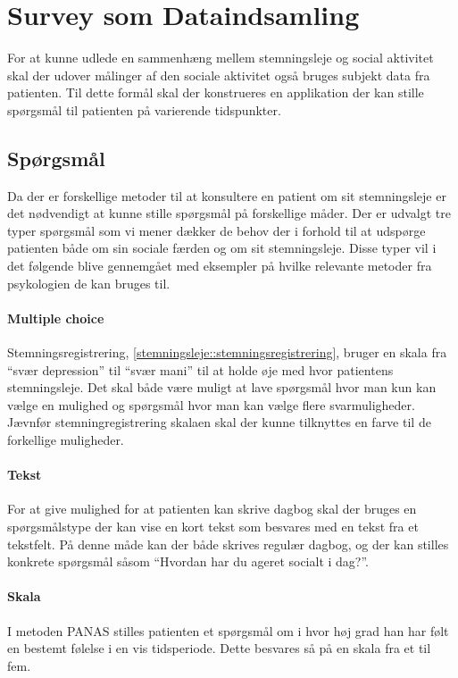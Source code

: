 \section{Survey som Dataindsamling}
For at kunne udlede en sammenhæng mellem stemningsleje og social aktivitet skal der udover målinger af den sociale aktivitet også bruges subjekt data fra patienten.
Til dette formål skal der konstrueres en applikation der kan stille spørgsmål til patienten på varierende tidspunkter.

\subsection{Spørgsmål}\label{survey:spg}
Da der er forskellige metoder til at konsultere en patient om sit stemningsleje er det nødvendigt at kunne stille spørgsmål på forskellige måder.
Der er udvalgt tre typer spørgsmål som vi mener dækker de behov der i forhold til at udspørge patienten både om sin sociale færden og om sit stemningsleje.
Disse typer vil i det følgende blive gennemgået med eksempler på hvilke relevante metoder fra psykologien de kan bruges til.

\paragraph{Multiple choice}
Stemningsregistrering, \cref{stemningsleje::stemningsregistrering}, bruger en skala fra ``svær depression'' til ``svær mani'' til at holde øje med hvor patientens stemningsleje.
Det skal både være muligt at lave spørgsmål hvor man kun kan vælge en mulighed og spørgsmål hvor man kan vælge flere svarmuligheder.
Jævnfør stemningregistrering skalaen skal der kunne tilknyttes en farve til de forkellige muligheder.


\paragraph{Tekst}
For at give mulighed for at patienten kan skrive dagbog  skal der bruges en spørgsmålstype der kan vise en kort tekst som besvares med en tekst fra et tekstfelt.
På denne måde kan der både skrives regulær dagbog, og der kan stilles konkrete spørgsmål såsom ``Hvordan har du ageret socialt i dag?''.

\paragraph{Skala}
I metoden PANAS stilles patienten et spørgsmål om i hvor høj grad han har følt en bestemt følelse i en vis tidsperiode.
Dette besvares så på en skala fra et til fem.

